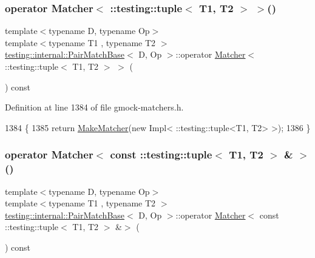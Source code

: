 \subsubsection{\texorpdfstring{operator Matcher$<$ \+::testing\+::tuple$<$ T1, T2 $>$ $>$()}{operator Matcher< ::testing::tuple< T1, T2 > >()}}
{\footnotesize\ttfamily template$<$typename D, typename Op$>$ \\
template$<$typename T1 , typename T2 $>$ \\
\hyperlink{classtesting_1_1internal_1_1PairMatchBase}{testing\+::internal\+::\+Pair\+Match\+Base}$<$ D, Op $>$\+::operator \hyperlink{classtesting_1_1Matcher}{Matcher}$<$ \+::testing\+::tuple$<$ T1, T2 $>$ $>$ (\begin{DoxyParamCaption}{ }\end{DoxyParamCaption}) const\hspace{0.3cm}{\ttfamily [inline]}}



Definition at line 1384 of file gmock-\/matchers.\+h.


\begin{DoxyCode}
1384                                                    \{
1385     \textcolor{keywordflow}{return} \hyperlink{namespacetesting_a37fd8029ac00e60952440a3d9cca8166}{MakeMatcher}(\textcolor{keyword}{new} Impl< ::testing::tuple<T1, T2> >);
1386   \}
\end{DoxyCode}
\mbox{\label{classtesting_1_1internal_1_1PairMatchBase_a0482f7e530420faecf00b9fca059b694}} 
\subsubsection{\texorpdfstring{operator Matcher$<$ const \+::testing\+::tuple$<$ T1, T2 $>$ \& $>$()}{operator Matcher< const ::testing::tuple< T1, T2 > \& >()}}
{\footnotesize\ttfamily template$<$typename D, typename Op$>$ \\
template$<$typename T1 , typename T2 $>$ \\
\hyperlink{classtesting_1_1internal_1_1PairMatchBase}{testing\+::internal\+::\+Pair\+Match\+Base}$<$ D, Op $>$\+::operator \hyperlink{classtesting_1_1Matcher}{Matcher}$<$ const \+::testing\+::tuple$<$ T1, T2 $>$ \&$>$ (\begin{DoxyParamCaption}{ }\end{DoxyParamCaption}) const\hspace{0.3cm}{\ttfamily [inline]}}



